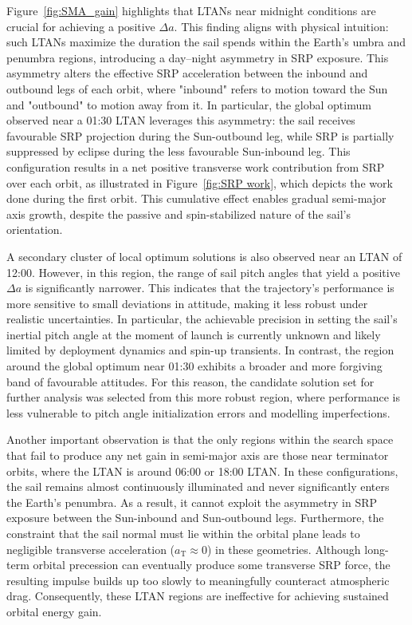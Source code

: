 \documentclass[final,3p,times,twocolumn]{elsarticle}
\begin{document}
\par\noindent Figure~\ref{fig:SMA_gain} highlights that LTANs near midnight conditions are crucial for achieving a positive \( \Delta a \). This finding aligns with physical intuition: such LTANs maximize the duration the sail spends within the Earth's umbra and penumbra regions, introducing a day--night asymmetry in SRP exposure. This asymmetry alters the effective SRP acceleration between the inbound and outbound legs of each orbit, where "inbound" refers to motion toward the Sun and "outbound" to motion away from it. In particular, the global optimum observed near a 01:30 LTAN leverages this asymmetry: the sail receives favourable SRP projection during the Sun-outbound leg, while SRP is partially suppressed by eclipse during the less favourable Sun-inbound leg. This configuration results in a net positive transverse work contribution from SRP over each orbit, as illustrated in Figure~\ref{fig:SRP work}, which depicts the work done during the first orbit. This cumulative effect enables gradual semi-major axis growth, despite the passive and spin-stabilized nature of the sail's orientation.

\vspace{5pt}
\par\noindent A secondary cluster of local optimum solutions is also observed near an LTAN of 12:00. However, in this region, the range of sail pitch angles that yield a positive \( \Delta a \) is significantly narrower. This indicates that the trajectory’s performance is more sensitive to small deviations in attitude, making it less robust under realistic uncertainties. In particular, the achievable precision in setting the sail’s inertial pitch angle at the moment of launch is currently unknown and likely limited by deployment dynamics and spin-up transients. In contrast, the region around the global optimum near 01:30 exhibits a broader and more forgiving band of favourable attitudes. For this reason, the candidate solution set for further analysis was selected from this more robust region, where performance is less vulnerable to pitch angle initialization errors and modelling imperfections.

\vspace{5pt}
\noindent Another important observation is that the only regions within the search space that fail to produce any net gain in semi-major axis are those near terminator orbits, where the LTAN is around 06:00 or 18:00 LTAN. In these configurations, the sail remains almost continuously illuminated and never significantly enters the Earth's penumbra. As a result, it cannot exploit the asymmetry in SRP exposure between the Sun-inbound and Sun-outbound legs. Furthermore, the constraint that the sail normal must lie within the orbital plane leads to negligible transverse acceleration (\( a_{\mathrm{T}} \approx 0 \)) in these geometries. Although long-term orbital precession can eventually produce some transverse SRP force, the resulting impulse builds up too slowly to meaningfully counteract atmospheric drag. Consequently, these LTAN regions are ineffective for achieving sustained orbital energy gain.
\end{document}
